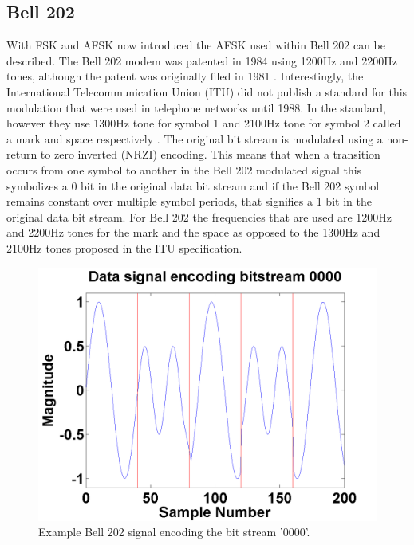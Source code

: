 \subsection{Bell 202}
With FSK and AFSK now introduced the AFSK used within Bell 202 can be described. The Bell 202 modem was patented in 1984 using 1200Hz and 2200Hz tones, although the patent was originally filed in 1981 \cite{stauffer1984fsk}. Interestingly, the International Telecommunication Union (ITU) did not publish a standard for this modulation that were used in telephone networks until 1988. In the standard, however they use 1300Hz tone for symbol 1 and 2100Hz tone for symbol 2 called a mark and space respectively \cite{ITUV23}. The original bit stream is modulated using a non-return to zero inverted (NRZI) encoding. This means that when a transition occurs from one symbol to another in the Bell 202 modulated signal this symbolizes a 0 bit in the original data bit stream and if the Bell 202 symbol remains constant over multiple symbol periods, that signifies a 1 bit in the original data bit stream. For Bell 202 the frequencies that are used are 1200Hz and 2200Hz tones for the mark and the space as opposed to the 1300Hz and 2100Hz tones proposed in the ITU specification.
\begin{figure}
  \centering
	\includegraphics[width=0.75\linewidth]{images/Datasignalencodingbitstream0000.png} 
	\caption{Example Bell 202 signal encoding the bit stream '0000'.}
	\label{exampleBitStream}
\end{figure}
